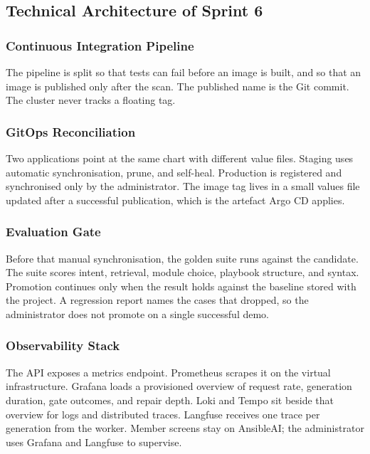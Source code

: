 \subsection{Technical Architecture of Sprint 6}

\subsubsection{Continuous Integration Pipeline}

The pipeline is split so that tests can fail before an image is built, and so that an image is published only after the scan. The published name is the Git commit. The cluster never tracks a floating tag.

\subsubsection{GitOps Reconciliation}

Two applications point at the same chart with different value files. Staging uses automatic synchronisation, prune, and self-heal. Production is registered and synchronised only by the administrator. The image tag lives in a small values file updated after a successful publication, which is the artefact Argo CD applies.

\subsubsection{Evaluation Gate}

Before that manual synchronisation, the golden suite runs against the candidate. The suite scores intent, retrieval, module choice, playbook structure, and syntax. Promotion continues only when the result holds against the baseline stored with the project. A regression report names the cases that dropped, so the administrator does not promote on a single successful demo.

\subsubsection{Observability Stack}

The API exposes a metrics endpoint. Prometheus scrapes it on the virtual infrastructure. Grafana loads a provisioned overview of request rate, generation duration, gate outcomes, and repair depth. Loki and Tempo sit beside that overview for logs and distributed traces. Langfuse receives one trace per generation from the worker. Member screens stay on AnsibleAI; the administrator uses Grafana and Langfuse to supervise.

